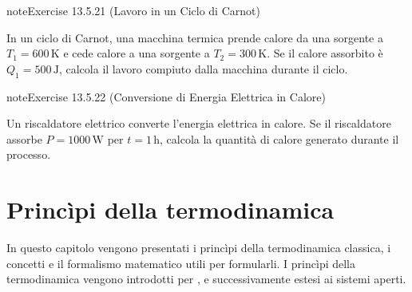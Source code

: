 \documentclass[letterpaper,10pt,italian]{jupyterBook}
\begin{document}
\begin{sphinxadmonition}{note}{Exercise 13.5.21 (Lavoro in un Ciclo di Carnot)}



\sphinxAtStartPar
In un ciclo di Carnot, una macchina termica prende calore da una sorgente a \(T_1 = 600 \, \text{K}\) e cede calore a una sorgente a \(T_2 = 300 \, \text{K}\). Se il calore assorbito è \(Q_1 = 500 \, \text{J}\), calcola il lavoro compiuto dalla macchina durante il ciclo.
\end{sphinxadmonition}
 \label{exercise:ch/thermodynamics/foundation-problems-exercise-21}

\begin{sphinxadmonition}{note}{Exercise 13.5.22 (Conversione di Energia Elettrica in Calore)}



\sphinxAtStartPar
Un riscaldatore elettrico converte l’energia elettrica in calore. Se il riscaldatore assorbe \(P = 1000 \, \text{W}\) per \(t = 1 \, \text{h}\), calcola la quantità di calore generato durante il processo.
\end{sphinxadmonition}

\sphinxstepscope


\chapter{Princìpi della termodinamica}
\label{\detokenize{ch/thermodynamics/principles:principi-della-termodinamica}}\label{\detokenize{ch/thermodynamics/principles:physics-hs-thermodynamics-principles}}\label{\detokenize{ch/thermodynamics/principles::doc}}
\sphinxAtStartPar
In questo capitolo vengono presentati i princìpi della termodinamica classica, i concetti e il formalismo matematico utili per formularli.
I princìpi della termodinamica vengono introdotti per , e successivamente estesi ai sistemi aperti.
\end{document}
